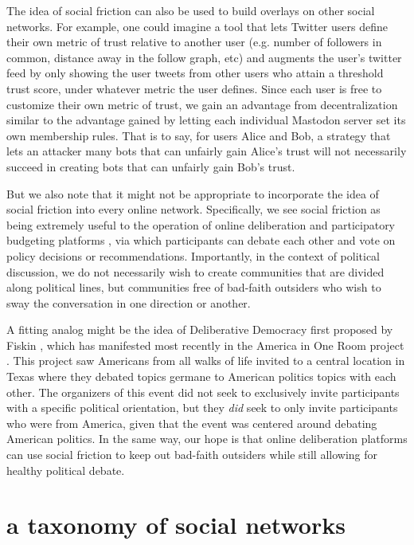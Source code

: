 \documentclass[sigconf,authordraft]{acmart}
\begin{document}
The idea of social friction can also be used to build overlays on other social networks. For example, one could imagine a tool that lets Twitter users define their own metric of trust relative to another user (e.g. number of followers in common, distance away in the follow graph, etc) and augments the user's twitter feed by only showing the user tweets from other users who attain a threshold trust score, under whatever metric the user defines. Since each user is free to customize their own metric of trust, we gain an advantage from decentralization similar to the advantage gained by letting each individual Mastodon server set its own membership rules. That is to say, for users Alice and Bob, a strategy that lets an attacker many bots that can unfairly gain Alice's trust will not necessarily succeed in creating bots that can unfairly gain Bob's trust.

But we also note that it might not be appropriate to incorporate the idea of social friction into every online network. Specifically, we see social friction as being extremely useful to the operation of online deliberation \cite{semaan2015designing} and participatory budgeting platforms \cite{de1998participatory,shah2007participatory,wampler2010participatory,cabannes2004participatory}, via which participants can debate each other and vote on policy decisions or recommendations. Importantly, in the context of political discussion, we do not necessarily wish to create communities that are divided along political lines, but communities free of bad-faith outsiders who wish to sway the conversation in one direction or another. 

A fitting analog might be the idea of Deliberative Democracy first proposed by Fiskin \cite{fishkin1991democracy}, which has manifested most recently in the America in One Room project \cite{AmericaInOneRoom}. This project saw Americans from all walks of life invited to a central location in Texas where they debated topics germane to American politics topics with each other. The organizers of this event did not seek to exclusively invite participants with a specific political orientation, but they {\itshape did} seek to only invite participants who were from America, given that the event was centered around debating American politics. In the same way, our hope is that online deliberation platforms can use social friction to keep out bad-faith outsiders while still allowing for healthy political debate.

\section{a taxonomy of social networks}
\end{document}
